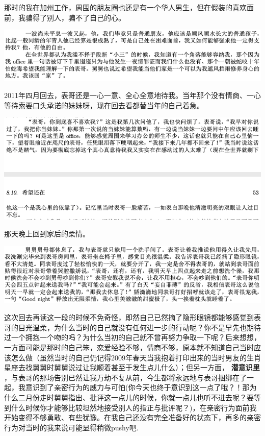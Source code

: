 \documentclass[9pt, b5paper]{article}
\begin{document}
那时的我在加州工作，周围的朋友圈也还是有一个华人男生，但在假装的喜欢面前，我骗得了别人，骗不了自己的心。 

\begin{center}
\includegraphics[width=.9\linewidth]{./pic/p1p52-2.png}
\end{center}

2011年四月回去，表哥还是一心一意、全心全意地待我。当年那个没有情商、一心等待索要口头承诺的妹妹呀，现在回去看都替当年的自己着急。 

\begin{center}
\includegraphics[width=.9\linewidth]{./pic/p1p52-3.png}
\end{center}

那天晚上回到家后的柔情。 

\begin{center}
\includegraphics[width=.9\linewidth]{./pic/p1p54.png}
\end{center}

这次回去再读这一段的时候不免奇怪，即然自己已然摘了隐形眼镜都能够感觉到表哥的目光温柔，为什么当时的自己就没有任何进一步的行动呢？你不是早先也期待过一个拥抱一个吻的吗？为什么当初的自己就不曾再努力争取一下呢？后来想想，一方面可能是那时的自己笨，恋爱经验不够，情商不够，原本就不知道自己当时应该怎么做（虽然当时的自己仍记得2009年春天当我抱着打印出来的当时男友的生肖星座去找舅舅时舅舅说过让我顺着甚至于发生点儿什么）；但另一方面， \textbf{潜意识里} ，与表哥的那场告别已然让我万劫不复从前，今生都将永远地与表哥捆绑在了一起，我意识到了亲密行为的威力与可怕(你今天也终于意识到这一点了哦？！那为什么二月份走时舅舅指出、批评这一点儿的时候，你就一点儿也听不进去呢？要等到什么时候你才能够比较坦然地接受别人的指正与批评呢？)，在亲密行为面前我开始变得不够勇敢、有些犹豫。在我自己还没有完全准备好的状态下，再多的亲密行为对当时的我来说可能显得稍微pushy吧.
\end{document}
